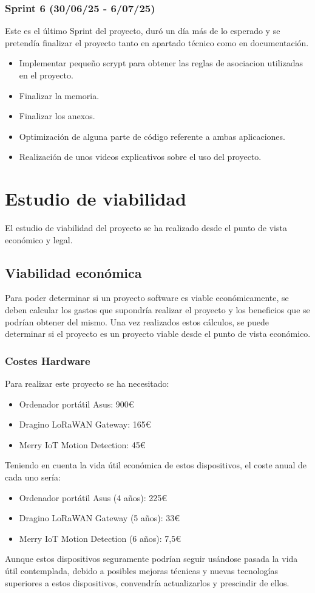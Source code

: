 
\subsubsection{Sprint 6 (30/06/25 - 6/07/25)}
Este es el último Sprint del proyecto, duró un día más de lo esperado y se pretendía finalizar el proyecto tanto en apartado técnico como en documentación. 

\begin{itemize}
    \item Implementar pequeño scrypt para obtener las reglas de asociacion utilizadas en el proyecto.
    \item Finalizar la memoria.
    \item Finalizar los anexos.
    \item Optimización de alguna parte de código referente a ambas aplicaciones.
    \item Realización de unos videos explicativos sobre el uso del proyecto.
\end{itemize}


\section{Estudio de viabilidad}
El estudio de viabilidad del proyecto se ha realizado desde el punto de vista económico y legal.
\subsection{Viabilidad económica}
Para poder determinar si un proyecto software es viable económicamente, se deben calcular los gastos que supondría realizar el proyecto y los beneficios que se podrían obtener del mismo. Una vez realizados estos cálculos, se puede determinar si el proyecto es un proyecto viable desde el punto de vista económico.
\subsubsection{Costes Hardware}
Para realizar este proyecto se ha necesitado:
\begin{itemize}
    \item Ordenador portátil Asus: 900€
    \item Dragino LoRaWAN Gateway: 165€
    \item Merry IoT Motion Detection: 45€
\end{itemize}
Teniendo en cuenta la vida útil económica de estos dispositivos, el coste anual de cada uno sería:
\begin{itemize}
    \item Ordenador portátil Asus (4 años): 225€
    \item Dragino LoRaWAN Gateway (5 años): 33€
    \item Merry IoT Motion Detection (6 años): 7,5€
\end{itemize}
Aunque estos dispositivos seguramente podrían seguir usándose pasada la vida útil contemplada, debido a posibles mejoras técnicas y  nuevas tecnologías superiores a estos dispositivos, convendría actualizarlos y prescindir de ellos. 
